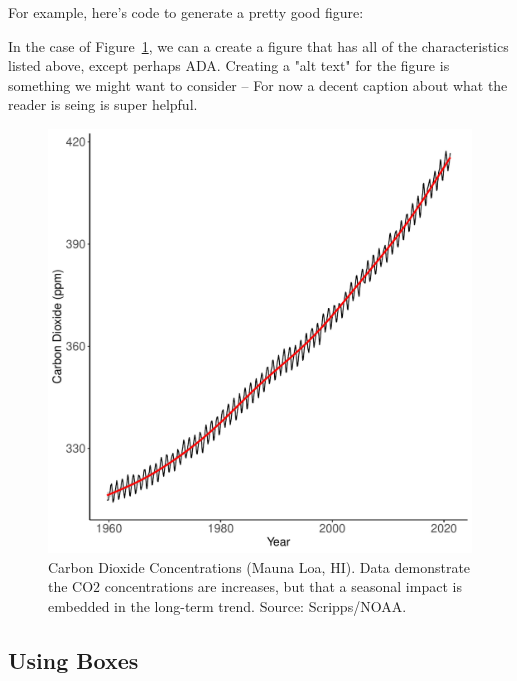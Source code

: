 \documentclass{book}\usepackage{knitr}
\begin{document}
For example, here's code to generate a pretty good figure: 





In the case of Figure~\ref{fig:co2-graphic}, we can a create a figure that has all of the characteristics listed above, except perhaps ADA. Creating a "alt text" for the figure is something we might want to consider -- For now a decent caption about what the reader is seing is super helpful. 

\begin{figure}
\begin{knitrout}
\color{fgcolor}
\includegraphics[width=\maxwidth]{figure/maunaloa-1} 

\end{knitrout}
\caption{Carbon Dioxide Concentrations (Mauna Loa, HI). Data demonstrate the CO$2$ concentrations are increases, but that a seasonal impact is embedded in the long-term trend. Source: Scripps/NOAA.}
\label{fig:co2-graphic}
\end{figure}

\subsection{Using Boxes}
\end{document}
